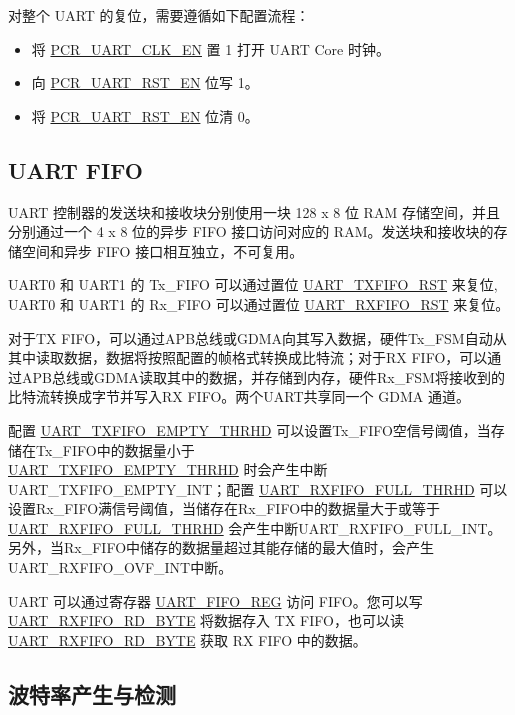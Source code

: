 \documentclass[main\_\_CN.tex]{subfiles}
\begin{document}
对整个 UART 的复位，需要遵循如下配置流程：
\begin{itemize}
    \item 将 \hyperref[fielddesc:PCRUART0CLKEN]{PCR\_UART\_CLK\_EN} 置 1 打开 UART Core 时钟。
    \item 向 \hyperref[fielddesc:PCRUART0RSTEN]{PCR\_UART\_RST\_EN} 位写 1。
    \item 将 \hyperref[fielddesc:PCRUART0RSTEN]{PCR\_UART\_RST\_EN} 位清 0。
\end{itemize}

\subsection{UART FIFO}


UART 控制器的发送块和接收块分别使用一块 128 x 8 位 RAM 存储空间，并且分别通过一个 4 x 8 位的异步 FIFO 接口访问对应的 RAM。发送块和接收块的存储空间和异步 FIFO 接口相互独立，不可复用。

UART0 和 UART1 的 Tx\_FIFO 可以通过置位 \hyperref[fielddesc:UARTTXFIFORST]{UART\_TXFIFO\_RST} 来复位, UART0 和 UART1 的 Rx\_FIFO 可以通过置位 \hyperref[fielddesc:UARTRXFIFORST]{UART\_RXFIFO\_RST} 来复位。

对于TX FIFO，可以通过APB总线或GDMA向其写入数据，硬件Tx\_FSM自动从其中读取数据，数据将按照配置的帧格式转换成比特流；对于RX FIFO，可以通过APB总线或GDMA读取其中的数据，并存储到内存，硬件Rx\_FSM将接收到的比特流转换成字节并写入RX FIFO。两个UART共享同一个 GDMA 通道。

配置 \hyperref[fielddesc:UARTTXFIFOEMPTYTHRHD]{UART\_TXFIFO\_EMPTY\_THRHD} 可以设置Tx\_FIFO空信号阈值，当存储在Tx\_FIFO中的数据量小于 \\\hyperref[fielddesc:UARTTXFIFOEMPTYTHRHD]{UART\_TXFIFO\_EMPTY\_THRHD} 时会产生中断UART\_TXFIFO\_EMPTY\_INT；配置 \hyperref[fielddesc:UARTRXFIFOFULLTHRHD]{UART\_RXFIFO\_FULL\_THRHD} 可以设置Rx\_FIFO满信号阈值，当储存在Rx\_FIFO中的数据量大于或等于 \hyperref[fielddesc:UARTRXFIFOFULLTHRHD]{UART\_RXFIFO\_FULL\_THRHD} 会产生中断UART\_RXFIFO\_FULL\_INT。另外，当Rx\_FIFO中储存的数据量超过其能存储的最大值时，会产生UART\_RXFIFO\_OVF\_INT中断。

UART 可以通过寄存器 \hyperref[regdesc:UARTFIFOREG]{UART\_FIFO\_REG} 访问 FIFO。您可以写 \hyperref[fielddesc:UARTRXFIFORDBYTE]{UART\_RXFIFO\_RD\_BYTE} 将数据存入 TX FIFO，也可以读 \hyperref[fielddesc:UARTRXFIFORDBYTE]{UART\_RXFIFO\_RD\_BYTE} 获取 RX FIFO 中的数据。

\subsection{波特率产生与检测}
\end{document}
